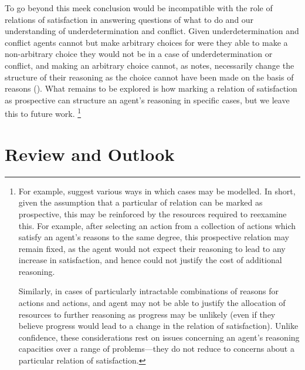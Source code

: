 \documentclass[10pt]{article}
\begin{document}
To go beyond this meek conclusion would be incompatible with the role of relations of satisfaction in answering questions of what to do and our understanding of underdetermination and conflict.
Given underdetermination and conflict agents cannot but make arbitrary choices for were they able to make a non-arbitrary choice they would not be in a case of underdetermination or conflict, and making an arbitrary choice cannot, as \citeauthor{Broome:2001aa} notes, necessarily change the structure of their reasoning as the choice cannot have been made on the basis of reasons (\citeyear[119]{Broome:2001aa}).
What remains to be explored is how marking a relation of satisfaction as prospective can structure an agent's reasoning in specific cases, but we leave this to future work.\nolinebreak
\footnote{
  For example, \textcite{Easwaran:2018aa} suggest various ways in which cases may be modelled.
In short, given the assumption that a particular of relation can be marked as prospective, this may be reinforced by the resources required to reexamine this.
For example, after selecting an action from a collection of actions which satisfy an agent's reasons to the same degree, this prospective relation may remain fixed, as the agent would not expect their reasoning to lead to any increase in satisfaction, and hence could not justify the cost of additional reasoning.

Similarly, in cases of particularly intractable combinations of reasons for actions and actions, and agent may not be able to justify the allocation of resources to further reasoning as progress may be unlikely (even if they believe progress would lead to a change in the relation of satisfaction).
Unlike confidence, these considerations rest on issues concerning an agent's reasoning capacities over a range of problems---they do not reduce to concerns about a particular relation of satisfaction.
}


\section{Review and Outlook}
\label{sec:review-outlook}
\end{document}
